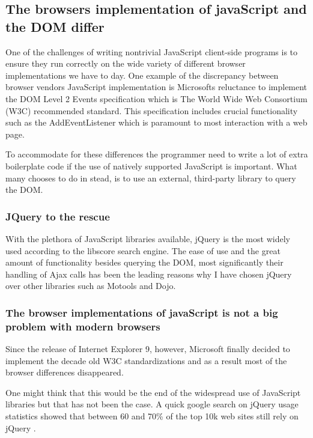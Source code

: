 \documentclass[english]{ifimaster}
\begin{document}
\subsection{The browsers implementation of javaScript and the DOM differ}
One of the challenges of writing nontrivial JavaScript client-side programs is to ensure they run correctly on the wide variety of different browser implementations we have to day\parencite[p. 325]{flanagan}. One example of the discrepancy between browser vendors JavaScript implementation is Microsofts reluctance to implement the DOM Level 2 Events specification which is The World Wide Web Consortium (W3C) recommended standard\parencite{w3c}. This specification includes crucial functionality such as the AddEventListener which is paramount to most interaction with a web page. 

To accommodate for these differences the programmer need to write a lot of extra boilerplate code if the use of natively supported JavaScript is important. What many chooses to do in stead, is to use an external, third-party library to query the DOM. 

\subsubsection{JQuery to the rescue}
With the plethora of JavaScript libraries available, jQuery is the most widely used according to the libscore search engine\parencite{infoWorld}. The ease of use and the great amount of functionality besides querying the DOM, most significantly their handling of Ajax calls has been the leading reasons why I have chosen jQuery over other libraries such as Motools and Dojo. 

\subsubsection{The browser implementations of javaScript is not a big problem with modern browsers}
Since the release of Internet Explorer 9, however, Microsoft finally decided to implement the decade old W3C standardizations and as a result most of the browser differences disappeared. 

One might think that this would be the end of the widespread use of JavaScript libraries but that has not been the case. A quick google search on jQuery usage statistics showed that between 60 and 70\% of the top 10k web sites still rely on jQuery \parencite{jQueryWiki} \parencite{jQueryW3Tech}\parencite{builtWith}. 
\end{document}

